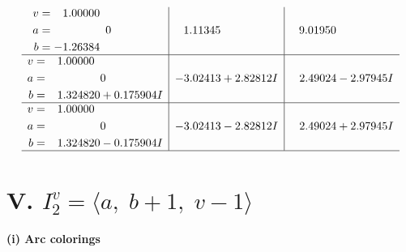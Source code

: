 \documentclass[1p]{elsarticle_modified}
\theoremstyle{definition}
\begin{document}
$$\begin{array}{c|c|c}
\begin{aligned}
v &= \phantom{-}1.00000\phantom{ +0.000000I} \\
a &= \phantom{-0.000000 } 0 \\
b &= -1.26384\phantom{ +0.000000I}\end{aligned}
 & \phantom{-}1.11345\phantom{ +0.000000I} & \phantom{-}9.01950\phantom{ +0.000000I} \\ \hline\begin{aligned}
v &= \phantom{-}1.00000\phantom{ +0.000000I} \\
a &= \phantom{-0.000000 } 0 \\
b &= \phantom{-}1.324820 + 0.175904 I\end{aligned}
 & -3.02413 + 2.82812 I & \phantom{-}2.49024 - 2.97945 I \\ \hline\begin{aligned}
v &= \phantom{-}1.00000\phantom{ +0.000000I} \\
a &= \phantom{-0.000000 } 0 \\
b &= \phantom{-}1.324820 - 0.175904 I\end{aligned}
 & -3.02413 - 2.82812 I & \phantom{-}2.49024 + 2.97945 I\\
 \hline 
 \end{array}$$\newpage\newpage\renewcommand{\arraystretch}{1}
\centering \section*{V. $I^v_{2}= \langle a,\;b+1,\;v-1 \rangle$}
\flushleft \textbf{(i) Arc colorings}\\
\end{document}
